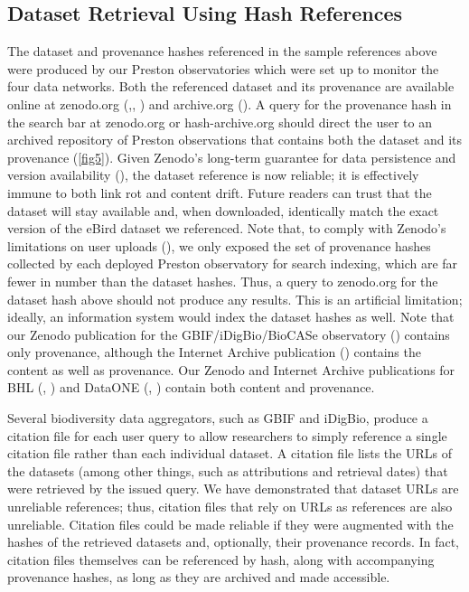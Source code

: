 \documentclass[12pt,letterpaper]{article}
\begin{document}
\subsection*{Dataset Retrieval Using Hash References}

The dataset and provenance hashes referenced in the sample references above were produced by our Preston observatories which were set up to monitor the four data networks. Both the referenced dataset and its provenance are available online at zenodo.org (\cite{poelen_jorrit_h_2019_3483218},\cite{poelen_jorrit_h_2019_3484555}, \cite{poelen_jorrit_h_2019_3484205}) and archive.org (\cite{poelen_jorrit_h_2019_archive_org}). A query for the provenance hash in the search bar at zenodo.org or hash-archive.org should direct the user to an archived repository of Preston observations that contains both the dataset and its provenance (\ref{fig5}). Given Zenodo’s long-term guarantee for data persistence and version availability (\cite{zenodo_2019}), the dataset reference is now reliable; it is effectively immune to both link rot and content drift. Future readers can trust that the dataset will stay available and, when downloaded, identically match the exact version of the eBird dataset we referenced. Note that, to comply with Zenodo’s limitations on user uploads (\cite{zenodo_2019}), we only exposed the set of provenance hashes collected by each deployed Preston observatory for search indexing, which are far fewer in number than the dataset hashes. Thus, a query to zenodo.org for the dataset hash above should not produce any results. This is an artificial limitation; ideally, an information system would index the dataset hashes as well. Note that our Zenodo publication for the GBIF/iDigBio/BioCASe observatory (\cite{poelen_jorrit_h_2019_3484205}) contains only provenance, although the Internet Archive publication (\cite{poelen_jorrit_h_2019_archive_org}) contains the content as well as provenance. Our Zenodo and Internet Archive publications for BHL (\cite{poelen_jorrit_h_2019_3484555}, \cite{poelen_jorrit_h_2019_archive_org_bhl}) and DataONE (\cite{poelen_jorrit_h_2019_3483218}, \cite{poelen_jorrit_h_2019_archive_org_dataone}) contain both content and provenance.

Several biodiversity data aggregators, such as GBIF and iDigBio, produce a citation file for each user query to allow researchers to simply reference a single citation file rather than each individual dataset. A citation file lists the URLs of the datasets (among other things, such as attributions and retrieval dates) that were retrieved by the issued query. We have demonstrated that dataset URLs are unreliable references; thus, citation files that rely on URLs as references are also unreliable. Citation files could be made reliable if they were augmented with the hashes of the retrieved datasets and, optionally, their provenance records. In fact, citation files themselves can be referenced by hash, along with accompanying provenance hashes, as long as they are archived and made accessible.
\end{document}

